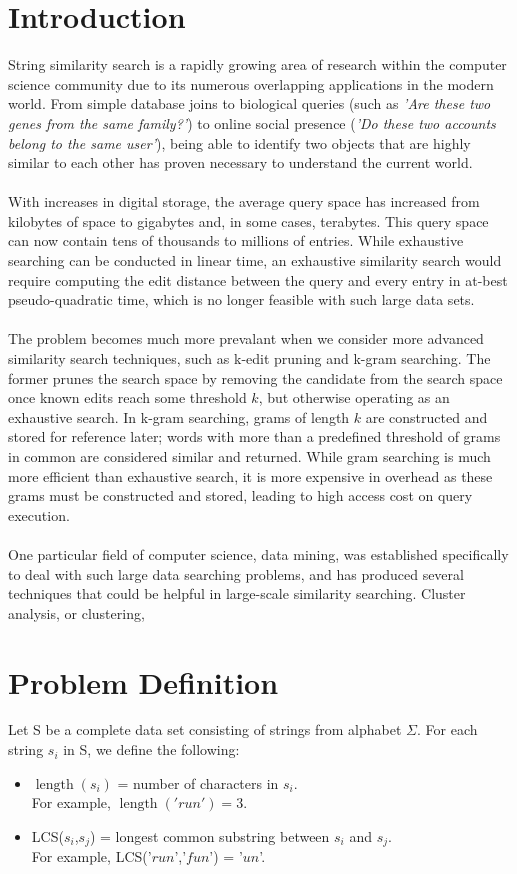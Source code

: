 \documentclass[pdftex,12pt,letter]{article}
\DeclareMathOperator{\length}{length}
\begin{document}
\section{Introduction}
String similarity search is a rapidly growing area of research within the computer science community due to its numerous overlapping applications in the modern world. From simple database joins to biological queries (such as \textit{'Are these two genes from the same family?'}) to online social presence (\textit{'Do these two accounts belong to the same user'}), being able to identify two objects that are highly similar to each other has proven necessary to understand the current world. \\
\\
With increases in digital storage, the average query space has increased from kilobytes of space to gigabytes and, in some cases, terabytes. This query space can now contain tens of thousands to millions of entries. While exhaustive searching can be conducted in linear time, an exhaustive similarity search would require computing the edit distance between the query and every entry in at-best pseudo-quadratic time, which is no longer feasible with such large data sets.\\
\\
The problem becomes much more prevalant when we consider more advanced similarity search techniques, such as k-edit pruning and k-gram searching. The former prunes the search space by removing the candidate from the search space once known edits reach some threshold $k$, but otherwise operating as an exhaustive search. In k-gram searching, grams of length $k$ are constructed and stored for reference later; words with more than a predefined threshold of grams in common are considered similar and returned. While gram searching is much more efficient than exhaustive search, it is more expensive in overhead as these grams must be constructed and stored, leading to high access cost on query execution.\\
\\
One particular field of computer science, data mining, was established specifically to deal with such large data searching problems, and has produced several techniques that could be helpful in large-scale similarity searching. Cluster analysis, or clustering, 

\section{Problem Definition}
Let S be a complete data set consisting of strings from alphabet $\Sigma$. For each string $s_i$ in S, we define the following:
\begin{itemize}
\item $\length(s_i)$ = number of characters in $s_i$.\\ For example, $\length('run') = 3$.
\item LCS($s_i$,$s_j$) = longest common substring between $s_i$ and $s_j$.\\ For example, LCS('$run$','$fun$') = '$un$'.
\end{itemize}
\end{document}
